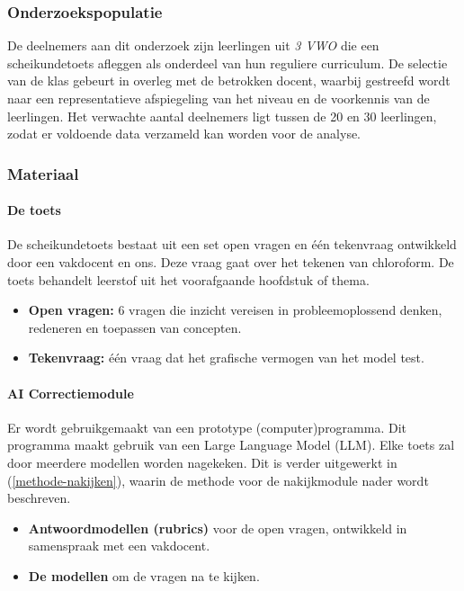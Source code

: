 \documentclass[12pt]{article}
\begin{document}
\subsubsection*{Onderzoekspopulatie}
De deelnemers aan dit onderzoek zijn leerlingen uit \emph{3 VWO} die een scheikundetoets afleggen als onderdeel van hun reguliere curriculum. De selectie van de klas gebeurt in overleg met de betrokken docent, waarbij gestreefd wordt naar een representatieve afspiegeling van het niveau en de voorkennis van de leerlingen. Het verwachte aantal deelnemers ligt tussen de 20 en 30 leerlingen, zodat er voldoende data verzameld kan worden voor de analyse.

\subsubsection*{Materiaal}
\paragraph{De toets} 
De scheikundetoets bestaat uit een set open vragen en één tekenvraag ontwikkeld door een vakdocent en ons. Deze vraag gaat over het tekenen van chloroform. De toets behandelt leerstof uit het voorafgaande hoofdstuk of thema.
\begin{itemize}
    \item \textbf{Open vragen:} 6 vragen die inzicht vereisen in probleemoplossend denken, redeneren en toepassen van concepten.
    \item \textbf{Tekenvraag:} één vraag dat het grafische vermogen van het model test.
\end{itemize}

\paragraph{AI Correctiemodule} 
Er wordt gebruikgemaakt van een prototype (computer)programma. Dit programma maakt gebruik van een Large Language Model (LLM). Elke toets zal door meerdere modellen worden nagekeken. Dit is verder uitgewerkt in (\ref{methode-nakijken}), waarin de methode voor de nakijkmodule nader wordt beschreven.
\begin{itemize}
    \item \textbf{Antwoordmodellen (rubrics)} voor de open vragen, ontwikkeld in samenspraak met een vakdocent.
    \item \textbf{De modellen} om de vragen na te kijken.
\end{itemize}
\end{document}
